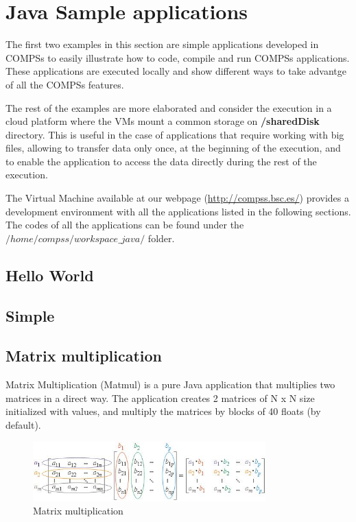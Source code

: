 \section{Java Sample applications}
\label{sec:JavaSampleApps}

The first two examples in this section are simple applications developed in COMPSs to easily illustrate how to code,
compile and run COMPSs applications. These applications are executed locally and show different ways to take advantge
of all the COMPSs features. 

The rest of the examples are more elaborated and consider the execution in a cloud platform where the VMs mount a common 
storage on \textbf{/sharedDisk} directory. This is useful in the case of applications that require working 
with big files, allowing to transfer data only once, at the beginning of the execution, and to enable 
the application to access the data directly during the rest of the execution.

The Virtual Machine available at our webpage (\url{http://compss.bsc.es/}) provides a development environment with
all the applications listed in the following sections. The codes of all the applications can be found under the 
$/home/compss/workspace\_java/$ folder. 

\subsection{Hello World}

\subsection{Simple}

\subsection{Matrix multiplication}
Matrix Multiplication (Matmul) is a pure Java application that multiplies two matrices in a direct way. 
The application creates 2 matrices of N x N size initialized with values, and multiply the matrices by 
blocks of 40 floats (by default).

\begin{figure}[ht!]
  \centering
    \includegraphics[width=0.8\textwidth]{./Sections/2_Java/Figures/matrix.jpeg}
    \caption{Matrix multiplication} 
    \label{fig:matrix}
\end{figure}


